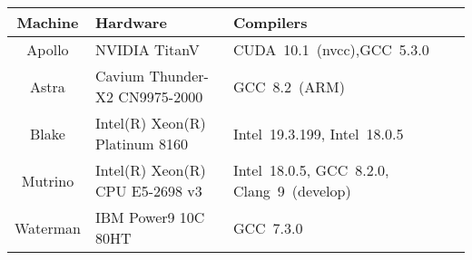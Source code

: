 \renewcommand{\arraystretch}{1.5}
\begin{tabularx}{0.45\textwidth}{|c|>{\raggedright\arraybackslash}X|>{\raggedright\arraybackslash}X|}
\hline
Machine & Hardware & Compilers \\
\hline
    Apollo & NVIDIA TitanV & CUDA~10.1~(nvcc),\newline GCC~5.3.0 \\
Astra & Cavium Thunder-X2 CN9975-2000 & GCC~8.2~(ARM) \\ 
Blake & Intel(R) Xeon(R) Platinum 8160 & Intel~19.3.199, Intel~18.0.5 \\
Mutrino & Intel(R) Xeon(R) CPU E5-2698 v3 & Intel~18.0.5, GCC~8.2.0, Clang~9~(develop) \\
Waterman & IBM Power9 10C 80HT & GCC~7.3.0 \\
\hline
\end{tabularx}
\renewcommand{\arraystretch}{1.0}

